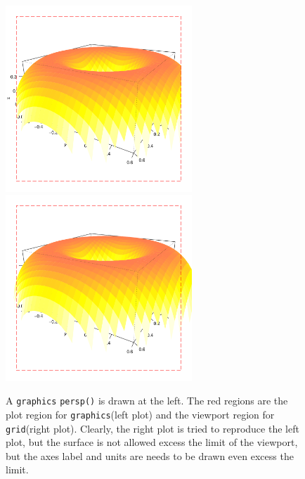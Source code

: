 \documentclass[paper=a4, fontsize=11pt]{report}
\begin{document}
\begin{figure}[h]
	\begin{center}
		\includegraphics[height = 7cm, width = 7cm]{figure/gridGraphics_persp_demo_viewport3_1.pdf}
		\includegraphics[height = 7cm, width = 7cm]{figure/gridGraphics_persp_demo_viewport3_2.pdf}
		\caption{A \texttt{graphics} \texttt{persp()} is drawn at the left. The red regions are the plot region for \texttt{graphics}(left plot) and the viewport region for \texttt{grid}(right plot). Clearly, the right plot is tried to reproduce the left plot, but the surface is not allowed excess the limit of the viewport, but the axes label and units are needs to be drawn even excess the limit.}
		\label{figure_4.5}
	\end{center}
\end{figure}
\end{document}
